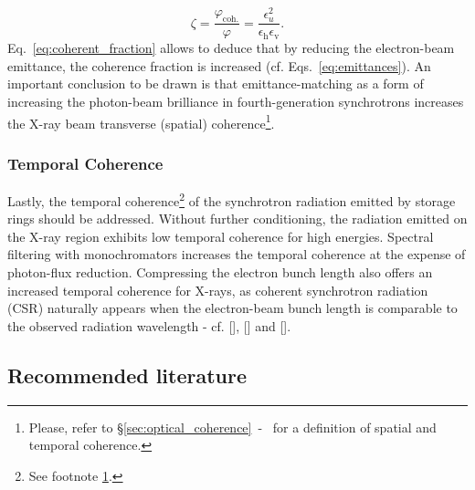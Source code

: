 \begin{refsection}
\begin{equation}\label{eq:coherent_fraction}
\zeta =  \frac{\varphi_\mathrm{coh.}}{\varphi}=\frac{\epsilon^2_{u}}{\epsilon_\mathrm{h}\epsilon_\mathrm{v}}.
\end{equation}{}
Eq.~\ref{eq:coherent_fraction} allows to deduce that by reducing the electron-beam emittance, the coherence fraction is increased (cf. Eqs.~\ref{eq:emittances}). An important conclusion to be drawn is that emittance-matching as a form of increasing the photon-beam brilliance in fourth-generation synchrotrons increases the X-ray beam transverse (spatial) coherence\footnote{Please, refer to §\ref{sec:optical_coherence}~-~\textit{} for a definition of spatial and temporal coherence.\label{note:coherence}}.

\subsubsection*{Temporal Coherence}

Lastly, the temporal coherence\footnote{See footnote \ref{note:coherence}.} of the synchrotron radiation emitted by storage rings should be addressed. Without further conditioning, the radiation emitted on the X-ray region exhibits low temporal coherence for high energies. Spectral filtering with monochromators increases the temporal coherence at the expense of photon-flux reduction. Compressing the electron bunch length also offers an increased temporal coherence for X-rays, as coherent synchrotron radiation (CSR) naturally appears when the electron-beam bunch length is comparable to the observed radiation wavelength - cf. [\cite{Chubar2006}], [\cite[\textit{§3.8} \& \textit{§13}]{Talman2006}] and [\cite[\textit{§21.7}]{Wiedemann2015}]. 

\subsection*{Recommended literature}


\end{refsection}
